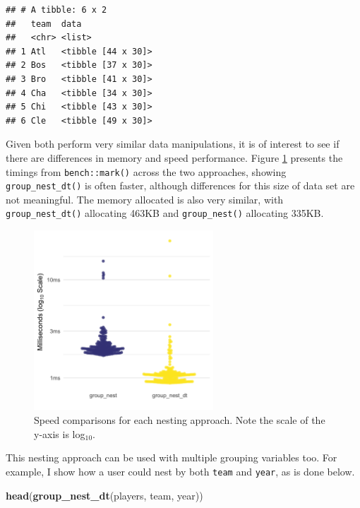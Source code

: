 \documentclass[doc,floatsintext]{apa6}
\newenvironment{Shaded}{\begin{snugshade}}{\end{snugshade}}
\newcommand{\KeywordTok}[1]{\textcolor[rgb]{0.13,0.29,0.53}{\textbf{#1}}}
\newcommand{\NormalTok}[1]{#1}
\begin{document}
\begin{verbatim}
## # A tibble: 6 x 2
##   team  data              
##   <chr> <list>            
## 1 Atl   <tibble [44 x 30]>
## 2 Bos   <tibble [37 x 30]>
## 3 Bro   <tibble [41 x 30]>
## 4 Cha   <tibble [34 x 30]>
## 5 Chi   <tibble [43 x 30]>
## 6 Cle   <tibble [49 x 30]>
\end{verbatim}

Given both perform very similar data manipulations, it is of interest to see if there are differences in memory and speed performance. Figure \ref{speed} presents the timings from \texttt{bench::mark()} across the two approaches, showing \texttt{group\_nest\_dt()} is often faster, although differences for this size of data set are not meaningful. The memory allocated is also very similar, with \texttt{group\_nest\_dt()} allocating 463KB and \texttt{group\_nest()} allocating 335KB.

\begin{figure}[tb]
  \centering
  \includegraphics[width=0.6\textwidth]{timings_manuscript.png}
  \caption{Speed comparisons for each nesting approach. Note the scale of the y-axis is log$_{10}$.}
  \label{speed}
\end{figure}

This nesting approach can be used with multiple grouping variables too. For example, I show how a user could nest by both \texttt{team} and \texttt{year}, as is done below.

\begin{Shaded}
\begin{Highlighting}[]
\KeywordTok{head}\NormalTok{(}\KeywordTok{group_nest_dt}\NormalTok{(players, team, year))}
\end{Highlighting}
\end{Shaded}
\end{document}
